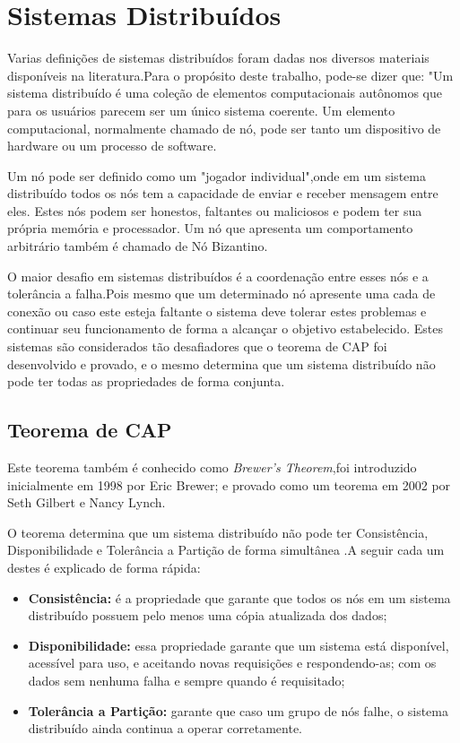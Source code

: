 \section{Sistemas Distribuídos}

    Varias definições de sistemas distribuídos foram dadas nos diversos materiais disponíveis na literatura.Para o propósito deste trabalho, pode-se dizer que: "Um sistema distribuído é uma coleção de elementos computacionais autônomos que para os usuários parecem ser um único sistema coerente. Um elemento computacional, normalmente chamado de nó, pode ser tanto um dispositivo de hardware ou um processo de software.\cite{sistemas_distribuidos_tanembaum}

    Um nó pode ser definido como um "jogador individual",onde em um sistema distribuído todos os nós tem a capacidade de enviar e receber mensagem entre eles. Estes nós podem ser honestos, faltantes ou maliciosos e podem ter sua própria memória e processador. Um nó que apresenta um comportamento arbitrário também é chamado de Nó Bizantino.\cite{mastering_blockchain}

    O maior desafio em sistemas distribuídos é a coordenação entre esses nós e a tolerância a falha.Pois mesmo que um determinado nó apresente uma cada de conexão
    ou caso este esteja faltante o sistema deve tolerar estes problemas e continuar seu funcionamento de forma a alcançar o objetivo estabelecido. Estes sistemas 
    são considerados tão desafiadores que o teorema de CAP foi desenvolvido e provado, e o mesmo determina que um sistema distribuído não pode ter todas as propriedades de forma conjunta.

    \subsection{Teorema de CAP}

        Este teorema também é conhecido como \textit{Brewer's Theorem},foi introduzido inicialmente em 1998 por Eric Brewer; e provado como um teorema em 2002 por Seth Gilbert e Nancy Lynch.

        O teorema determina que um sistema distribuído não pode ter Consistência, Disponibilidade e Tolerância a Partição de forma simultânea \cite{brewer_distributed}.A seguir cada um destes é explicado de forma rápida:

        \begin{itemize}
            \item \textbf{Consistência:} é a propriedade que garante que todos os nós em um sistema distribuído possuem pelo menos uma cópia atualizada dos dados;
            \item \textbf{Disponibilidade:} essa propriedade garante que um sistema está disponível, acessível para uso, e aceitando novas requisições e respondendo-as;
        com os dados sem nenhuma falha e sempre quando é requisitado;
            \item \textbf{Tolerância a Partição:} garante que caso um grupo de nós falhe, o sistema distribuído ainda continua a operar corretamente.
        \end{itemize}

